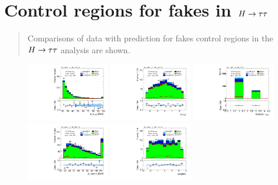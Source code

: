 \chapter[Control regions for fakes in $\Htautau$][Control regions for fakes in $\Htautau$]{Control regions for fakes in $\Htautau$}
\label{apx:control-regions}

\begin{quote}
Comparisons of data with prediction for fakes control regions in the $\Htautau$ analysis are shown.
\end{quote}

\begin{figure}[tp]
  \centering
  \includegraphics[width=0.32\textwidth]{figures/analysis/vbf-WlvCR/tau-pt}
  \includegraphics[width=0.32\textwidth]{figures/analysis/vbf-WlvCR/tau-eta}
  \includegraphics[width=0.32\textwidth]{figures/analysis/vbf-WlvCR/tau-numTrack}
  \includegraphics[width=0.32\textwidth]{figures/analysis/vbf-WlvCR/lep-pt-hi}
  \includegraphics[width=0.32\textwidth]{figures/analysis/vbf-WlvCR/lep-eta}

\end{figure}

